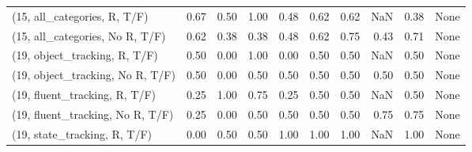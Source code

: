 \begin{table*}[h!]
\begin{adjustbox}{width=2\columnwidth,center}
\begin{tabular}{lrrr|rrr|rrr}
(15, all\_categories, R, T/F)          &                      0.67 &                  0.50 &                      1.00 &                          0.48 &                      0.62 &                          0.62 &                                    NaN &                               0.38 &                                  None \\
(15, all\_categories, No R, T/F)       &                      0.62 &                  0.38 &                      0.38 &                          0.48 &                      0.62 &                          0.75 &                                   0.43 &                               0.71 &                                  None \\



\midrule
(19, object\_tracking, R, T/F)         &                      0.50 &                  0.00 &                      1.00 &                          0.00 &                      0.50 &                          0.50 &                                    NaN &                               0.50 &                                  None \\
(19, object\_tracking, No R, T/F)      &                      0.50 &                  0.00 &                      0.50 &                          0.50 &                      0.50 &                          0.50 &                                   0.50 &                               0.50 &                                  None \\
(19, fluent\_tracking, R, T/F)         &                      0.25 &                  1.00 &                      0.75 &                          0.25 &                      0.50 &                          0.50 &                                    NaN &                               0.50 &                                  None \\
(19, fluent\_tracking, No R, T/F)      &                      0.25 &                  0.00 &                      0.50 &                          0.50 &                      0.50 &                          0.50 &                                   0.75 &                               0.75 &                                  None \\
(19, state\_tracking, R, T/F)          &                      0.00 &                  0.50 &                      0.50 &                          1.00 &                      1.00 &                          1.00 &                                    NaN &                               1.00 &                                  None \\

\end{tabular}
\end{adjustbox}
\end{table*}
